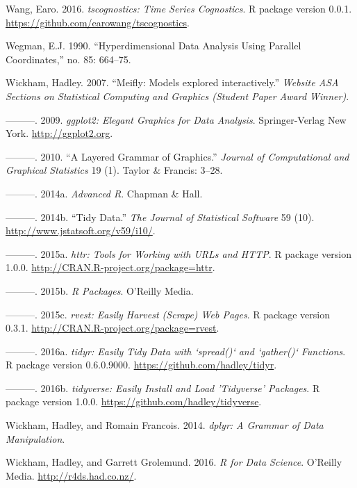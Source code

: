 \documentclass[12pt,]{isuthesis}
\begin{document}
\hypertarget{ref-tscognostics}{}
Wang, Earo. 2016. \emph{tscognostics: Time Series Cognostics}. R package
version 0.0.1. \url{https://github.com/earowang/tscognostics}.

\hypertarget{ref-Wegman:90}{}
Wegman, E.J. 1990. ``Hyperdimensional Data Analysis Using Parallel
Coordinates,'' no. 85: 664--75.

\hypertarget{ref-Wickham:2007wq}{}
Wickham, Hadley. 2007. ``Meifly: Models explored interactively.''
\emph{Website ASA Sections on Statistical Computing and Graphics
(Student Paper Award Winner)}.

\hypertarget{ref-ggplot2}{}
---------. 2009. \emph{ggplot2: Elegant Graphics for Data Analysis}.
Springer-Verlag New York. \url{http://ggplot2.org}.

\hypertarget{ref-ggplot2-paper}{}
---------. 2010. ``A Layered Grammar of Graphics.'' \emph{Journal of
Computational and Graphical Statistics} 19 (1). Taylor \& Francis:
3--28.

\hypertarget{ref-adv-r}{}
---------. 2014a. \emph{Advanced R}. Chapman \& Hall.

\hypertarget{ref-tidy-data}{}
---------. 2014b. ``Tidy Data.'' \emph{The Journal of Statistical
Software} 59 (10). \url{http://www.jstatsoft.org/v59/i10/}.

\hypertarget{ref-httr}{}
---------. 2015a. \emph{httr: Tools for Working with URLs and HTTP}. R
package version 1.0.0. \url{http://CRAN.R-project.org/package=httr}.

\hypertarget{ref-rpkgs}{}
---------. 2015b. \emph{R Packages}. O'Reilly Media.

\hypertarget{ref-rvest}{}
---------. 2015c. \emph{rvest: Easily Harvest (Scrape) Web Pages}. R
package version 0.3.1. \url{http://CRAN.R-project.org/package=rvest}.

\hypertarget{ref-tidyr}{}
---------. 2016a. \emph{tidyr: Easily Tidy Data with `spread()` and
`gather()` Functions}. R package version 0.6.0.9000.
\url{https://github.com/hadley/tidyr}.

\hypertarget{ref-tidyverse}{}
---------. 2016b. \emph{tidyverse: Easily Install and Load 'Tidyverse'
Packages}. R package version 1.0.0.
\url{https://github.com/hadley/tidyverse}.

\hypertarget{ref-dplyr}{}
Wickham, Hadley, and Romain Francois. 2014. \emph{dplyr: A Grammar of
Data Manipulation}.

\hypertarget{ref-r4ds}{}
Wickham, Hadley, and Garrett Grolemund. 2016. \emph{R for Data Science}.
O'Reilly Media. \url{http://r4ds.had.co.nz/}.
\end{document}
